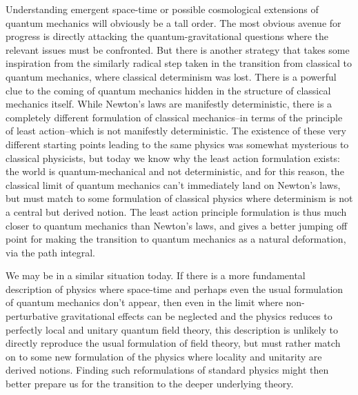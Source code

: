 \documentclass[12pt,nohyper,twosided]{JHEP3}
\begin{document}
Understanding emergent space-time or possible cosmological
extensions of quantum mechanics  will obviously be a tall order. The
most obvious avenue for progress is directly attacking the
quantum-gravitational questions where the relevant issues must be
confronted. But there is another strategy that takes some
inspiration from the similarly radical  step taken in the transition
from classical to quantum mechanics, where classical determinism was
lost. There is a powerful clue to the coming of quantum mechanics
hidden in the structure of classical mechanics itself. While
Newton's laws are manifestly deterministic, there is a completely
different formulation of classical mechanics--in terms of the
principle of least action--which is not manifestly deterministic.
The existence of these very different starting points leading to the
same physics was somewhat mysterious to classical physicists, but
today we know why the least action formulation exists: the world is
quantum-mechanical and not deterministic, and for this reason, the
classical limit of quantum mechanics can't immediately land on
Newton's laws, but must match to some formulation of classical
physics where determinism is not a central but derived notion. The
least action principle formulation is thus much closer to quantum
mechanics than Newton's laws, and gives a better jumping off point
for making the transition to quantum mechanics as a natural
deformation, via the path integral.

We may be in a similar situation today. If there is a more
fundamental description of physics where space-time and perhaps even
the usual formulation of quantum mechanics don't appear, then even
in the limit where non-perturbative gravitational effects can be
neglected and the physics reduces to perfectly local and unitary
quantum field theory, this description is unlikely to directly
reproduce the usual formulation of field theory, but must rather
match on to some new formulation of the physics where locality and
unitarity are derived notions. Finding such reformulations of
standard physics might then better prepare us for the transition to
the deeper underlying theory.
\end{document}
